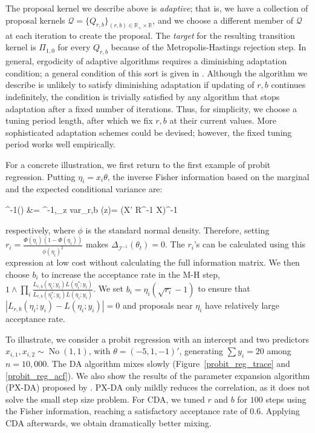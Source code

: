 \documentclass[12pt]{article}
\newcommand{\be}{\begin{equs}}
\newcommand{\ee}{\end{equs}}
\newcommand{\bb}[1]{\mathbb{#1}}
\newcommand{\mc}[1]{\mathcal{#1}}
\DeclareMathOperator{\No}{No}
\DeclareMathOperator{\diag}{diag}
\begin{document}
The proposal kernel we describe above is \emph{adaptive}; that is, we have a collection of proposal kernels $\mc Q = \{Q_{r,b}\}_{(r,b) \in \bb R_+ \times \bb R}$, and we choose a different member of $\mc Q$ at each iteration to create the proposal. The \emph{target} for the resulting transition kernel is $\Pi_{1,0}$ for every $Q_{r,b}$ because of the Metropolis-Hastings rejection step.  In general, ergodicity of adaptive algorithms requires a diminishing adaptation condition; a general condition of this sort is given in \cite{roberts2007coupling}. Although the algorithm we describe is unlikely to satisfy diminishing adaptation if updating of $r,b$ continues indefinitely, the condition is trivially satisfied by any algorithm that stops adaptation after a fixed number of iterations. Thus, for simplicity, we choose a tuning period length, after which we fix $r,b$ at their current values. More sophisticated adaptation schemes could be devised; however, the fixed tuning period works well empirically.

For a concrete illustration, we first return to the first example of probit regression. Putting $\eta_i = x_i\theta$, the inverse Fisher information based on the marginal and the expected conditional variance are:
\be
\mc I^{-1}(\theta) &= \bigg[ X'\diag\bigg\{\frac{\phi(\eta_i)^2}{ {\Phi(\eta_i)(1- \Phi(\eta_i))}}\bigg\} X \bigg]^{-1},\qquad \bb E_z \mbox{var}_{r,b} (\theta \mid z)= (X' R^{-1} X)^{-1}
\ee
respectively, where $\phi$ is the standard normal density. Therefore, setting $r_i = \frac{\Phi(\eta_i)(1- \Phi(\eta_i))} {\phi(\eta_i)^2}$ makes $\Delta_{\mc I^{-1}}(\theta_t)=0$.  The $r_i$'s can be calculated using this expression at low cost without calculating the full information matrix. We then choose $b_i$ to increase the acceptance rate in the M-H step, $1\wedge \prod_i \frac{   L_{r,b}(\eta_i;y_i) L(\eta_i^*;y_i)}{ L_{r,b}(\eta_i^*;y_i)L(\eta_i;y_i) }$. %
We set $b_i = \eta_i (\sqrt{r_i}-1)$ to ensure that $|L_{r,b}(\eta_i;y_i) - L(\eta_i;y_i)|=0$ and proposals near $\eta_i$ have relatively large acceptance rate.

To illustrate, we consider a probit regression with an intercept and two predictors $x_{i,1},x_{i,2}\sim \No(1,1)$, with $\theta=(-5,1,-1)'$, generating $\sum y_i=20$ among $n=10,000$. The \cite{albert1993bayesian} DA algorithm mixes slowly (Figure~\ref{probit_reg_trace} and \ref{probit_reg_acf}). We also show the 
results of the parameter expansion algorithm (PX-DA) proposed by \cite{liu1999parameter}. PX-DA only mildly reduces the correlation, as it does not solve the small step size problem.  For CDA, we tuned $r$ and $b$ for $100$ steps using the Fisher information, reaching a satisfactory acceptance rate of $0.6$. Applying CDA afterwards, we obtain dramatically better mixing. 
\end{document}
